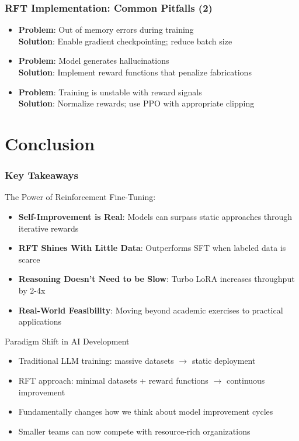 \documentclass[aspectratio=169]{beamer}
\begin{document}
\begin{frame}
	\frametitle{RFT Implementation: Common Pitfalls (2)}
	\begin{itemize}
		\item \textbf{Problem}: Out of memory errors during training\\
		  \textbf{Solution}: Enable gradient checkpointing; reduce batch size
		\item \textbf{Problem}: Model generates hallucinations\\
		  \textbf{Solution}: Implement reward functions that penalize fabrications
		\item \textbf{Problem}: Training is unstable with reward signals\\
		  \textbf{Solution}: Normalize rewards; use PPO with appropriate clipping
	\end{itemize}
\end{frame}

\section{Conclusion}

\begin{frame}
	\frametitle{Key Takeaways}
	\begin{block}{The Power of Reinforcement Fine-Tuning:}
		\begin{itemize}
			\item \textbf{Self-Improvement is Real}: Models can surpass static approaches through iterative rewards
			\item \textbf{RFT Shines With Little Data}: Outperforms SFT when labeled data is scarce
			\item \textbf{Reasoning Doesn't Need to be Slow}: Turbo LoRA increases throughput by 2-4x
			\item \textbf{Real-World Feasibility}: Moving beyond academic exercises to practical applications
		\end{itemize}
	\end{block}
	\begin{block}{Paradigm Shift in AI Development}
		\begin{itemize}
			\item Traditional LLM training: massive datasets $\rightarrow$ static deployment
			\item RFT approach: minimal datasets + reward functions $\rightarrow$ continuous improvement
			\item Fundamentally changes how we think about model improvement cycles
			\item Smaller teams can now compete with resource-rich organizations
		\end{itemize}
	\end{block}
\end{frame}
\end{document}
